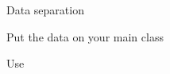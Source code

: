 
\begin{iframe}
\item Data separation
\item Put the data on your main class
\item Use 
\end{iframe}














\thankyouSlide
\renewcommand{\insertLogo}{}
\contactSlide
